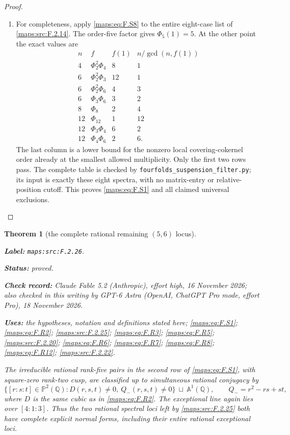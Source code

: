 \documentclass[11pt,a4paper]{article}
\newtheorem{theorem}{Theorem}[section]
\theoremstyle{definition}
\newcommand{\StatementRecord}[4]{\par\smallskip\begingroup\upshape\raggedright\noindent\textbf{Label:} \nolinkurl{#1}.\par\noindent\textbf{Status:} #2.\par\noindent\textbf{Check record:} #3.\par\noindent\textbf{Uses:} #4.\par\endgroup\smallskip}
\newcommand{\CurrentChecker}{GPT-6 Astra (OpenAI, ChatGPT Pro mode, effort Pro), 18 November 2026}
\begin{document}
\begin{proof}
\begin{enumerate}[label=\arabic*.]
\item For completeness, apply \eqref{maps:eq:F.S8} to the entire eight-case
list of \ref{maps:src:F.2.14}.  The order-five factor gives $\Phi_5(1)=5$.
At the other point the exact values are
\[
\begin{array}{c|c|r|r}
 n&f&f(1)&n/\gcd(n,f(1))\\\hline
 4&\Phi_2^2\Phi_4&8&1\\
 6&\Phi_2^2\Phi_3&12&1\\
 6&\Phi_2^2\Phi_6&4&3\\
 6&\Phi_3\Phi_6&3&2\\
 8&\Phi_8&2&4\\
 12&\Phi_{12}&1&12\\
 12&\Phi_3\Phi_4&6&2\\
 12&\Phi_4\Phi_6&2&6.
\end{array}
 \tag{F.S9}\label{maps:eq:F.S9}
\]
The last column is a lower bound for the nonzero local
covering-cokernel order already at the smallest allowed
multiplicity.  Only the first two rows pass.
The complete table is checked by
\texttt{fourfolds\_suspension\_filter.py}; its input is
exactly these eight spectra, with no matrix-entry or
relative-position cutoff.  This proves \eqref{maps:eq:F.S1} and all
claimed universal exclusions.

\end{enumerate}
\end{proof}




\begin{theorem}[the complete rational remaining $(5,6)$ locus]\label{maps:src:F.2.26}
\StatementRecord{maps:src:F.2.26}{proved}{Claude Fable 5.2 (Anthropic), effort high, 16 November 2026; also checked in this writing by \CurrentChecker}{the hypotheses, notation and definitions stated here; \cref{maps:eq:F.S1}; \cref{maps:eq:F.R2}; \cref{maps:src:F.2.25}; \cref{maps:eq:F.R3}; \cref{maps:eq:F.R5}; \cref{maps:src:F.2.20}; \cref{maps:eq:F.R6}; \cref{maps:eq:F.R7}; \cref{maps:eq:F.R8}; \cref{maps:eq:F.R12}; \cref{maps:src:F.2.22}}


The irreducible rational rank-five pairs in the second row
of \eqref{maps:eq:F.S1}, with square-zero rank-two cusp, are classified
up to simultaneous rational conjugacy by
\[
 \{[r:s:t]\in\mathbb P^2(\mathbb Q):
             D(r,s,t)\ne0,\ Q_-(r,s,t)\ne0\}
       \ \sqcup\ \mathbb A^1(\mathbb Q),
 \qquad Q_-=r^2-rs+st,
 \tag{F.R10}\label{maps:eq:F.R10}
\]
where $D$ is the same cubic as in \eqref{maps:eq:F.R2}.
The exceptional line again lies over $[4:1:3]$.
Thus the two rational spectral loci left by \ref{maps:src:F.2.25} both
have complete explicit normal forms, including their
entire rational exceptional loci.

\end{theorem}
\end{document}
